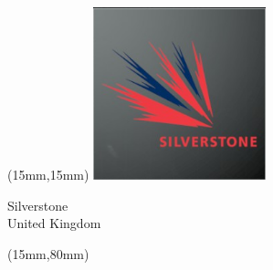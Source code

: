 \begin{textblock*}{50mm}(15mm,15mm)%
\includegraphics[width=50mm]{LG/2015-05-20_00094.png}
\par Silverstone\\ United Kingdom
\end{textblock*}
\begin{textblock*}{185mm}(15mm,80mm)%
\end{textblock*}
